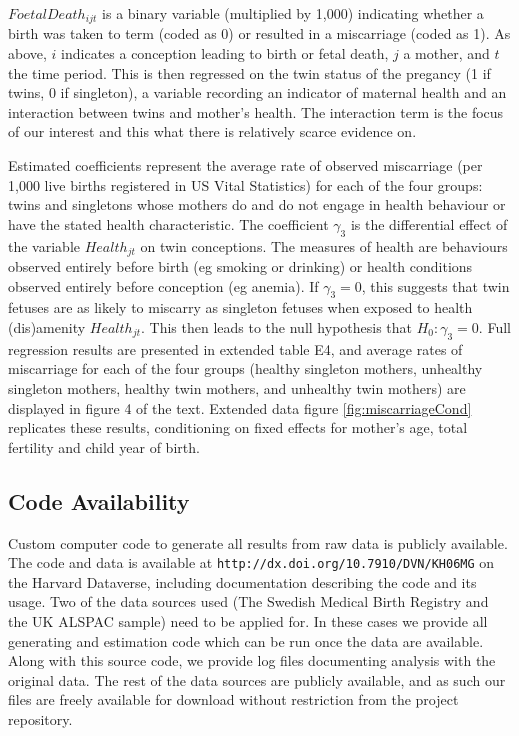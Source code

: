 \documentclass{nature}
\begin{document}
\begin{linenumbers}
$FoetalDeath_{ijt}$ is a binary variable (multiplied by 1,000) indicating whether a birth was taken to term (coded as 0) or resulted in a miscarriage (coded as 1).  As above, $i$ indicates a conception leading to birth or fetal death, $j$ a mother, and $t$ the time period. This is then regressed on the twin status of the pregancy (1 if twins, 0 if singleton), a variable recording an indicator of maternal health and an interaction between twins and mother's health. The interaction term is the focus of our interest and this what there is relatively scarce evidence on. 

Estimated coefficients represent the average rate of observed miscarriage (per 1,000 live births registered in US Vital Statistics) for each of the four groups: twins and singletons whose mothers do and do not engage in health behaviour or have the stated health characteristic. The coefficient $\gamma_3$ is the differential effect of the variable $Health_{jt}$ on twin conceptions. The measures of health are behaviours observed entirely before birth (eg smoking or drinking) or health conditions observed entirely before conception (eg anemia). If $\gamma_3=0$, this suggests that twin fetuses are as likely to miscarry as singleton fetuses when exposed to health (dis)amenity $Health_{jt}$.  This then leads to the null hypothesis that $H_0: \gamma_3=0$. Full regression results are presented in extended table E4, and average rates of miscarriage for each of the four groups (healthy singleton mothers, unhealthy singleton mothers, healthy twin mothers, and unhealthy twin mothers) are displayed in figure 4 of the text. Extended data figure \ref{fig:miscarriageCond} replicates these results, conditioning on fixed effects for mother's age, total fertility and child year of birth.

\subsection{Code Availability}
Custom computer code to generate all results from raw data is publicly available. The code and data is available at \texttt{http://dx.doi.org/10.7910/DVN/KH06MG} on the Harvard Dataverse, including documentation describing the code and its usage. Two of the data sources used (The Swedish Medical Birth Registry and the UK ALSPAC sample) need to be applied for. In these cases we provide all generating and estimation code which can be run once the data are available. Along with this source code, we provide log files documenting analysis with the original data.  The rest of the data sources are publicly available, and as such our files are freely available for download without restriction from the project repository.


\end{linenumbers}
\end{document}
